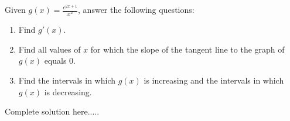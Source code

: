 \begin{example}
Given $g(x)=\displaystyle\frac{e^{2x+1}}{x^2}$, answer the following questions:
\renewcommand{\labelenumi}{\textbf{(\alph{enumi})}}
\begin{enumerate}[leftmargin=*]
\item Find $g'(x)$.
\item Find all values of $x$ for which the slope of the tangent line to the graph of $g(x)$ equals 0.

\item Find the intervals in which $g(x)$ is increasing and the intervals in which $g(x)$ is decreasing.
\end{enumerate}
    \begin{sol}
    \end{sol}
    \begin{solL}
    Complete solution here.....
    
    \end{solL}
    
\end{example}
\newpage
